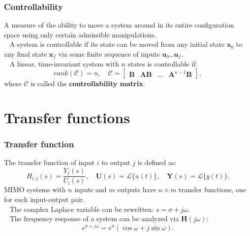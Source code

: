 \begin{frame}
\frametitle{Controllability}
A measure of the ability to move a system around in its entire configuration space using only certain admissible manipulations. \\
\ \newline
\pause
A system is controllable if its state can be moved from any initial state $\mathbf{x}_0$ to any final state $\mathbf{x}_f$ via some finite sequence of inputs $\mathbf{u}_0$\ldots$\mathbf{u}_f$. \\
\pause
\ \newline
A linear, time-invariant system with $n$ states is controllable if:
\begin{equation*}
rank(\mathcal{C}) = n,\quad \mathcal{C} = \begin{bmatrix} \mathbf{B} & \mathbf{AB} & \ldots & \mathbf{A}^{n-1}\mathbf{B} \end{bmatrix},
\end{equation*}
where $\mathcal{C}$ is called the \textbf{controllability matrix}.

\end{frame}


\section{Transfer functions}

\begin{frame}
\frametitle{Transfer function}
The transfer function of input $i$ to output $j$ is defined as:
\begin{equation*}
H_{i,j}(s) = \frac{Y_j(s)}{U_i(s)},\quad \mathbf{U}(s) = \mathcal{L}\{u(t)\},\quad \mathbf{Y}(s) = \mathcal{L}\{y(t)\}.
\end{equation*}
MIMO systems with $n$ inputs and $m$ outputs have $n\times m$ transfer functions, one for each input-output pair.\\
\ \newline
\pause
The complex Laplace variable can be rewritten: $s = \sigma + j\omega$. \\
\ \newline
\pause
The frequency response of a system can be analyzed via $\mathbf{H}(j\omega)$:
\begin{equation*}
e^{\sigma + j\omega} = e^\sigma ( \cos \omega + j \sin \omega ).
\end{equation*}
\end{frame}

